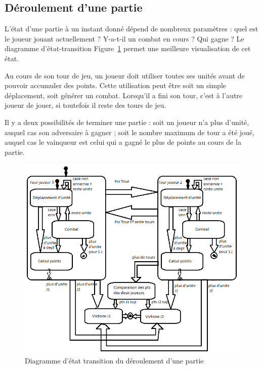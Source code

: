 \documentclass[a4paper]{article}%
\begin{document}
\subsection{Déroulement d'une partie}

L'état d'une partie à un instant donné dépend de nombreux paramètres : quel est le joueur jouant actuellement ? Y-a-t-il un combat en cours ? Qui gagne ? Le diagramme d'état-transition Figure~\ref{fig:state_transition_deroulementpartie} permet une meilleure visualisation de cet état.

\medskip

	Au cours de son tour de jeu, un joueur doit utiliser toutes ses unités avant de pouvoir accumuler des points. Cette utilisation peut être soit un simple déplacement, soit générer un combat. Lorsqu'il a fini son tour, c'est à l'autre joueur de jouer, si toutefois il reste des tours de jeu.
	
\medskip

	Il y a deux possibilités de terminer une partie : soit un joueur n'a plus d'unité, auquel cas son adversaire à gagner ; soit le nombre maximum de tour a été joué, auquel cas le vainqueur est celui qui a gagné le plus de points au cours de la partie.

\begin{figure}[H]
   \centering
   \includegraphics[width=\textwidth]{./images/state_transition/DiagEtatTransitionPartie.png}
                \caption{Diagramme d'état transition du déroulement d'une partie}
                \label{fig:state_transition_deroulementpartie}
\end{figure}
\end{document}
